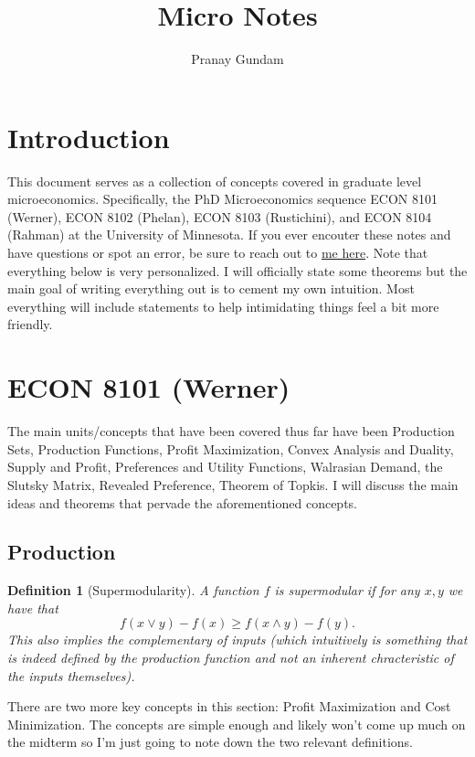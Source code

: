 \documentclass[11pt,english]{article}
\title{\textbf{Micro Notes}}
\author{Pranay Gundam}
\newtheorem{definition}{Definition}[section]
\begin{document}
\maketitle

\tableofcontents

\section{Introduction}

This document serves as a collection of concepts covered in graduate level microeconomics. Specifically, the PhD Microeconomics sequence ECON 8101 (Werner), ECON 8102 (Phelan), ECON 8103 (Rustichini), and ECON 8104 (Rahman) at the University of Minnesota. If you ever encouter these notes and have questions or spot an error, be sure to reach out to \href{mailto:pranaygundam00@gmail.com}{me here}. Note that everything below is very personalized. I will officially state some theorems but the main goal of writing everything out is to cement my own intuition. Most everything will include statements to help intimidating things feel a bit more friendly.

\section{ECON 8101 (Werner)}

The main units/concepts that have been covered thus far have been Production Sets, Production Functions, Profit Maximization, Convex Analysis and Duality, Supply and Profit, Preferences and Utility Functions, Walrasian Demand, the Slutsky Matrix, Revealed Preference, Theorem of Topkis. I will discuss the main ideas and theorems that pervade the aforementioned concepts.

\subsection{Production}

\begin{definition}[Supermodularity]
A function $f$ is supermodular if for any $x,y$ we have that $$f(x\lor y) - f(x) \geq f(x\land y) - f(y).$$ This also implies the complementary of inputs (which intuitively is something that is indeed defined by the production function and not an inherent chracteristic of the inputs themselves).
\end{definition}

There are two more key concepts in this section: Profit Maximization and Cost Minimization. The concepts are simple enough and likely won't come up much on the midterm so I'm just going to note down the two relevant definitions.
\end{document}
